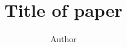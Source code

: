 \documentclass[12pt]{amsart}
\title{Title of paper}
\author{Author}
\date{}
\begin{document}
\begin{abstract}

\end{abstract}
\maketitle



\end{document}
